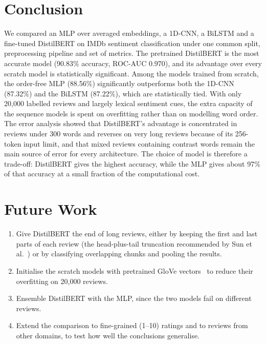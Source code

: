 \documentclass[conference,onecolumn,a4paper,10pt]{IEEEtran}
\begin{document}
\section{Conclusion}
We compared an MLP over averaged embeddings, a 1D-CNN, a BiLSTM and a fine-tuned DistilBERT on IMDb sentiment classification under one common split, preprocessing pipeline and set of metrics. The pretrained DistilBERT is the most accurate model (90.83\% accuracy, ROC-AUC 0.970), and its advantage over every scratch model is statistically significant. Among the models trained from scratch, the order-free MLP (88.56\%) significantly outperforms both the 1D-CNN (87.32\%) and the BiLSTM (87.22\%), which are statistically tied. With only 20,000 labelled reviews and largely lexical sentiment cues, the extra capacity of the sequence models is spent on overfitting rather than on modelling word order. The error analysis showed that DistilBERT's advantage is concentrated in reviews under 300 words and reverses on very long reviews because of its 256-token input limit, and that mixed reviews containing contrast words remain the main source of error for every architecture. The choice of model is therefore a trade-off: DistilBERT gives the highest accuracy, while the MLP gives about 97\% of that accuracy at a small fraction of the computational cost.

\section{Future Work}
\begin{enumerate}
\item Give DistilBERT the end of long reviews, either by keeping the first and last parts of each review (the head-plus-tail truncation recommended by Sun et al.~\cite{sun2019}) or by classifying overlapping chunks and pooling the results.
\item Initialise the scratch models with pretrained GloVe vectors~\cite{pennington2014} to reduce their overfitting on 20,000 reviews.
\item Ensemble DistilBERT with the MLP, since the two models fail on different reviews.
\item Extend the comparison to fine-grained (1--10) ratings and to reviews from other domains, to test how well the conclusions generalise.
\end{enumerate}

\end{document}
